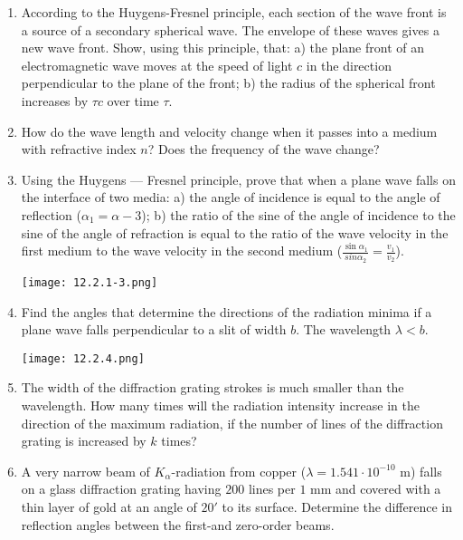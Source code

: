 \documentclass{article}
\begin{document}
\begin{enumerate}[label=12.2.\arabic*]


\item According to the Huygens-Fresnel principle, each section of the wave front is a source of a secondary spherical wave. The envelope of these waves gives a new wave front. Show, using this principle, that: a) the plane front of an electromagnetic wave moves at the speed of light $c$ in the direction perpendicular to the plane of the front; b) the radius of the spherical front increases by $\tau c$ over time $\tau$.

\item How do the wave length and velocity change when it passes into a medium with refractive index $n$? Does the frequency of the wave change?

\item Using the Huygens — Fresnel principle, prove that when a plane wave falls on the interface of two media: a) the angle of incidence is equal to the angle of reflection ($\alpha_1 = \alpha-3$); b) the ratio of the sine of the angle of incidence to the sine of the angle of refraction is equal to the ratio of the wave velocity in the first medium to the wave velocity in the second medium ($\frac{\sin \alpha_1}{sin \alpha_2} = \frac{v_1}{v_2}$).

\begin{center}
    \texttt{[image: 12.2.1-3.png]}
\end{center}


\item Find the angles that determine the directions of the radiation minima if a plane wave falls perpendicular to a slit of width $b$. The wavelength $\lambda < b$.

\begin{center}
    \texttt{[image: 12.2.4.png]}
\end{center}

\item The width of the diffraction grating strokes is much smaller than the wavelength. How many times will the radiation intensity increase in the direction of the maximum radiation, if the number of lines of the diffraction grating is increased by $k$ times?

\item A very narrow beam of $K_{\alpha}$-radiation from copper ($\lambda = 1.541 \cdot 10^{-10}$ m) falls on a glass diffraction grating having $200$ lines per $1$ mm and covered with a thin layer of gold at an angle of $20'$ to its surface. Determine the difference in reflection angles between the first-and zero-order beams.


\end{enumerate}
\end{document}
